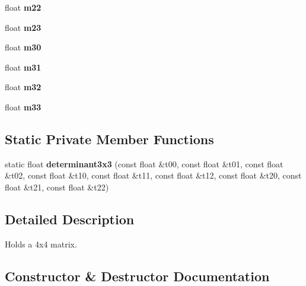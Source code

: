 \begin{DoxyCompactItemize}
float {\bfseries m22}
\item 
\mbox{\label{classflounder_1_1matrix4x4_afbc4cfa242eabc22cc72b21d564b2c3f}} 
float {\bfseries m23}
\item 
\mbox{\label{classflounder_1_1matrix4x4_a494845e56912e6e01978b19daf9b8e95}} 
float {\bfseries m30}
\item 
\mbox{\label{classflounder_1_1matrix4x4_a7dda47ca88e9f37867f97f30aa4c9c95}} 
float {\bfseries m31}
\item 
\mbox{\label{classflounder_1_1matrix4x4_a7331602f31f1d8ce2a9fdd2ed9cc4a4a}} 
float {\bfseries m32}
\item 
\mbox{\label{classflounder_1_1matrix4x4_a80b50133a216d9948e67dd43879b95e0}} 
float {\bfseries m33}
\end{DoxyCompactItemize}
\subsection*{Static Private Member Functions}
\begin{DoxyCompactItemize}
\item 
\mbox{\label{classflounder_1_1matrix4x4_a6c31f26011f881fda58a3a5c7c542444}} 
static float {\bfseries determinant3x3} (const float \&t00, const float \&t01, const float \&t02, const float \&t10, const float \&t11, const float \&t12, const float \&t20, const float \&t21, const float \&t22)
\end{DoxyCompactItemize}


\subsection{Detailed Description}
Holds a 4x4 matrix. 



\subsection{Constructor \& Destructor Documentation}
\mbox{\label{classflounder_1_1matrix4x4_a3d55e162ebc4f490eeee25e0a63de4c4}} 
